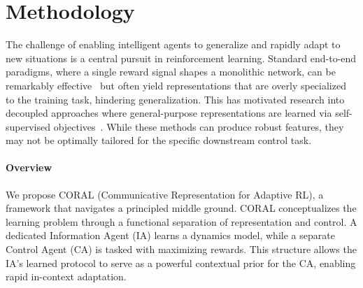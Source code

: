 \documentclass[letterpaper]{article} %
\begin{document}





\section{Methodology}
The challenge of enabling intelligent agents to generalize and rapidly adapt to new situations is a central pursuit in reinforcement learning. Standard end-to-end paradigms, where a single reward signal shapes a monolithic network, can be remarkably effective~\cite{mnihHumanlevelControlDeep2015} but often yield representations that are overly specialized to the training task, hindering generalization. This has motivated research into decoupled approaches where general-purpose representations are learned via self-supervised objectives~\cite{pmlr-v139-stooke21a, schwarzer2021pretraining}. While these methods can produce robust features, they may not be optimally tailored for the specific downstream control task.

\paragraph{Overview} We propose CORAL (Communicative Representation for Adaptive RL), a framework that navigates a principled middle ground. CORAL conceptualizes the learning problem through a functional separation of representation and control. A dedicated Information Agent (IA) learns a dynamics model, while a separate Control Agent (CA) is tasked with maximizing rewards. This structure allows the IA's learned protocol to serve as a powerful contextual prior for the CA, enabling rapid in-context adaptation.

\end{document}
